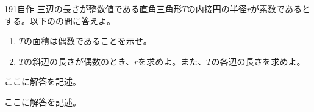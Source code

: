 \begin{prob}{191}{}{自作}
 三辺の長さが整数値である直角三角形$T$の内接円の半径$r$が素数であるとする。以下のの問に答えよ。
 \begin{enumerate}
  \item $T$の面積は偶数であることを示せ。
  \item $T$の斜辺の長さが偶数のとき、$r$を求めよ。また、$T$の各辺の長さを求めよ。
 \end{enumerate}
\end{prob}
ここに解答を記述。

ここに解答を記述。